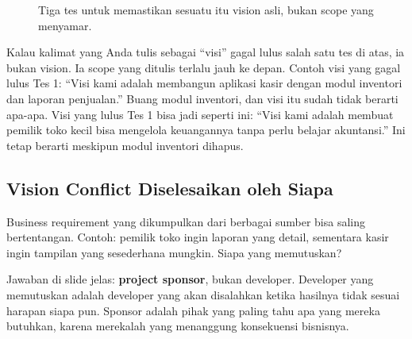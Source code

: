 \documentclass[11pt,a4paper]{article}
\begin{document}
\begin{figure}[H]
	\centering
	\caption{Tiga tes untuk memastikan sesuatu itu vision asli, bukan scope yang menyamar.}
	\label{fig:three-tests}
\end{figure}

Kalau kalimat yang Anda tulis sebagai ``visi'' gagal lulus salah satu tes di atas, ia bukan vision. Ia scope yang ditulis terlalu jauh ke depan. Contoh visi yang gagal lulus Tes 1: ``Visi kami adalah membangun aplikasi kasir dengan modul inventori dan laporan penjualan.'' Buang modul inventori, dan visi itu sudah tidak berarti apa-apa. Visi yang lulus Tes 1 bisa jadi seperti ini: ``Visi kami adalah membuat pemilik toko kecil bisa mengelola keuangannya tanpa perlu belajar akuntansi.'' Ini tetap berarti meskipun modul inventori dihapus.

\subsection{Vision Conflict Diselesaikan oleh Siapa}

Business requirement yang dikumpulkan dari berbagai sumber bisa saling bertentangan. Contoh: pemilik toko ingin laporan yang detail, sementara kasir ingin tampilan yang sesederhana mungkin. Siapa yang memutuskan?

Jawaban di slide jelas: \textbf{project sponsor}, bukan developer. Developer yang memutuskan adalah developer yang akan disalahkan ketika hasilnya tidak sesuai harapan siapa pun. Sponsor adalah pihak yang paling tahu apa yang mereka butuhkan, karena merekalah yang menanggung konsekuensi bisnisnya.
\end{document}
